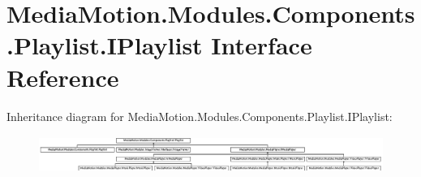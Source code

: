 \hypertarget{interface_media_motion_1_1_modules_1_1_components_1_1_playlist_1_1_i_playlist}{\section{Media\+Motion.\+Modules.\+Components.\+Playlist.\+I\+Playlist Interface Reference}
\label{interface_media_motion_1_1_modules_1_1_components_1_1_playlist_1_1_i_playlist}
}
Inheritance diagram for Media\+Motion.\+Modules.\+Components.\+Playlist.\+I\+Playlist\+:\begin{figure}[H]
\begin{center}
\leavevmode
\includegraphics[height=1.197861cm]{interface_media_motion_1_1_modules_1_1_components_1_1_playlist_1_1_i_playlist}
\end{center}
\end{figure}

